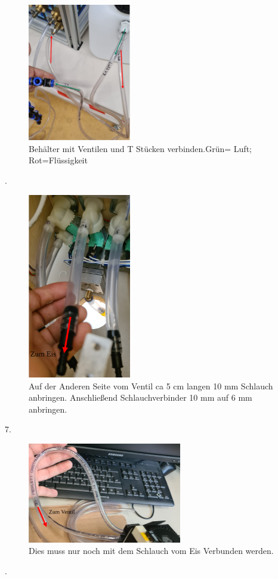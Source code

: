 \documentclass[10pt,a4paper]{report}
\begin{document}
	\begin{figure}[htb]
		\includegraphics[width=0.4\textwidth]{zu5.}
		\centering
		\caption{Behälter mit Ventilen und T Stücken verbinden.Grün= Luft; Rot=Flüssigkeit}
	\end{figure}
	
	.
	
	\begin{figure}[htb]
		\includegraphics[width=0.4\textwidth]{zu6.}
		\centering
		\caption{Auf der Anderen Seite vom Ventil ca 5 cm langen 10 mm Schlauch anbringen. Anschließend Schlauchverbinder 10 mm auf 6 mm anbringen.}
	\end{figure}
	
	7.
	
	\begin{figure}[htb]
		\includegraphics[width=0.6\textwidth]{zu7.}
		\centering
		\caption{Dies muss nur noch mit dem Schlauch vom Eis Verbunden werden.}
	\end{figure}
	.
	
\end{document}
